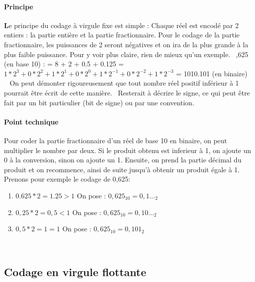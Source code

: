 \documentclass{article}
\begin{document}
\paragraph{Principe}
\textbf{L}e principe du codage \`a virgule fixe est simple : Chaque r\'eel est encod\'e par 2 entiers :  la partie enti\`ere et la partie fractionnaire.
Pour le codage de la partie fractionnaire, les puissances de 2 seront n\'egatives et on ira de la plus grande \`a la plus faible puissance. Pour y voir plus claire, rien de mieux qu'un exemple.\newline
~,625 (en base 10) : 
\newline = 8 + 2 + 0.5 + 0.125 
\newline = $1*2^{3} + 0*2^{2} + 1*2^{1} + 0*2^{0} + 1*2^{-1} + 0*2^{-2} + 1*2^{-3}$
\newline  = 1010.101 (en binaire) 
~\newline
\newline On peut d\'emonter rigoureusement que tout nombre r\'eel positif inf\'erieur \`a 1
pourrait \^etre \'ecrit de cette mani\`ere.~\cite{Codage_virgule_fixe}
Resterait \`a d\'ecrire le signe, ce qui peut \^etre fait par un bit particulier (bit de signe)
ou par une convention.
\paragraph{Point technique} Pour coder la partie fractionnaire d'un r\'eel de base 10 en binaire, on peut multiplier le nombre par deux. Si le produit obtenu est inferieur \`a 1, on ajoute un 0 \`a la conversion, sinon on ajoute un 1. Ensuite, on prend la partie d\'ecimal du produit et on recommence, ainsi de suite jusqu'\`a obtenir un produit \'egale \`a 1. 
\newline Prenons pour exemple le codage de 0,625:
\begin{enumerate}
\item $0.625*2 = 1.25 > 1$ On pose : $0,625_{10} = 0,1..._{2}$
\item $0,25*2 =  0,5 < 1$ On pose : $0,625_{10} = 0,10..._{2}$
\item $0,5*2  =  1 =  1$ On pose : $0,625_{10} = 0,101_{2}$
\end{enumerate}


~\newpage
\subsection{Codage en virgule flottante}
\end{document}
